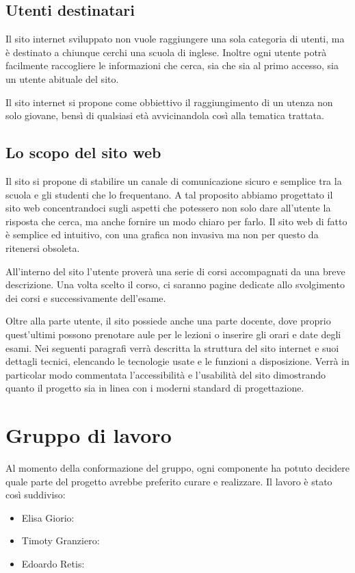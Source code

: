 \documentclass[12pt, a4paper]{article}
\begin{document}
\subsection{Utenti destinatari}
Il sito internet sviluppato non vuole raggiungere una sola categoria di utenti, ma è destinato a chiunque cerchi una scuola di inglese.  Inoltre ogni utente potrà facilmente raccogliere le informazioni che cerca, sia che sia al primo accesso, sia un utente abituale del sito.\par
Il sito internet si propone come obbiettivo il raggiungimento di un utenza non solo giovane, bensì di qualsiasi età avvicinandola così alla tematica trattata.

\subsection{Lo scopo del sito web}
Il sito si propone di stabilire un canale di comunicazione sicuro e semplice tra la scuola e gli studenti che lo frequentano. A tal proposito abbiamo progettato il sito web concentrandoci sugli aspetti che potessero non solo dare all’utente la risposta che cerca, ma anche fornire un modo chiaro per farlo. Il sito web di fatto è semplice ed intuitivo, con una grafica non invasiva ma non per questo da ritenersi obsoleta.\par
\bigskip
All’interno del sito l’utente proverà una serie di corsi accompagnati da una breve descrizione. Una volta scelto il corso, ci saranno pagine dedicate allo svolgimento dei corsi e successivamente dell’esame.\par
\bigskip
Oltre alla parte utente, il sito possiede anche una parte docente, dove proprio quest’ultimi possono prenotare aule per le lezioni o inserire gli orari e date degli esami.
Nei seguenti paragrafi verrà descritta la struttura del sito internet e suoi dettagli tecnici, elencando le tecnologie usate e le funzioni a disposizione. Verrà in particolar modo commentata l’accessibilità e l’usabilità del sito dimostrando quanto il progetto sia in linea con i moderni standard di progettazione.

\section{Gruppo di lavoro}
Al momento della conformazione del gruppo, ogni componente ha potuto decidere quale parte del progetto avrebbe preferito curare e realizzare. 
Il lavoro è stato così suddiviso:
\begin{itemize}
	\item Elisa Giorio:
	\item Timoty Granziero:
	\item Edoardo Retis:
\end{itemize}
\end{document}

